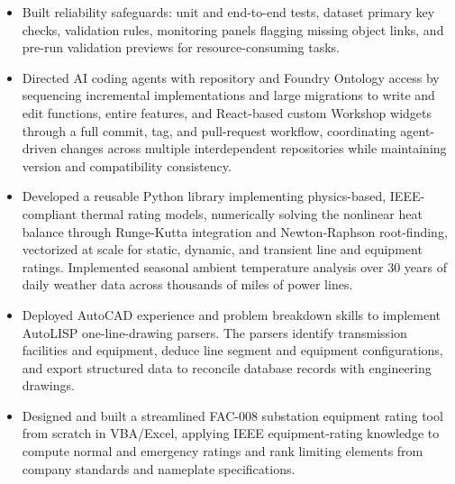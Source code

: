 \documentclass[10pt, letterpaper]{article}
\newenvironment{rlist}{%
  \begin{itemize}[leftmargin=1.4em, itemsep=1pt, topsep=2pt, parsep=0pt]%
}{%
  \end{itemize}%
}
\begin{document}
\begin{rlist}
  \item Built reliability safeguards: unit and end-to-end tests, dataset primary key checks, validation rules, monitoring panels flagging missing object links, and pre-run validation previews for resource-consuming tasks.
  \item Directed AI coding agents with repository and Foundry Ontology access by sequencing incremental implementations and large migrations to write and edit functions, entire features, and React-based custom Workshop widgets through a full commit, tag, and pull-request workflow, coordinating agent-driven changes across multiple interdependent repositories while maintaining version and compatibility consistency.
  \item Developed a reusable Python library implementing physics-based, IEEE-compliant thermal rating models, numerically solving the nonlinear heat balance through Runge-Kutta integration and Newton-Raphson root-finding, vectorized at scale for static, dynamic, and transient line and equipment ratings. Implemented seasonal ambient temperature analysis over 30 years of daily weather data across thousands of miles of power lines.
  \item Deployed AutoCAD experience and problem breakdown skills to implement AutoLISP one-line-drawing parsers. The parsers identify transmission facilities and equipment, deduce line segment and equipment configurations, and export structured data to reconcile database records with engineering drawings.
  \item Designed and built a streamlined FAC-008 substation equipment rating tool from scratch in VBA/Excel, applying IEEE equipment-rating knowledge to compute normal and emergency ratings and rank limiting elements from company standards and nameplate specifications.
\end{rlist}
\end{document}
